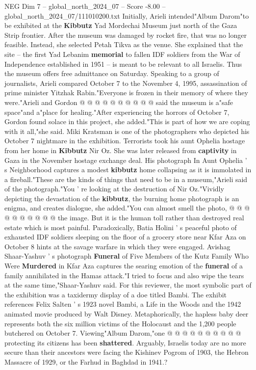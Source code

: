 \begin{textsample}{NEG Dim 7 – global\_north\_2024\_07 – Score -8.00 – global\_north\_2024\_07/111010200.txt}
Initially, Arieli intended"Album Darom"to be exhibited at the \textbf{Kibbutz} Yad Mordechai Museum just north of the Gaza Strip frontier.
After the museum was damaged by rocket fire, that was no longer feasible.
Instead, she selected Petah Tikva as the venue.
She explained that the site -- the first Yad Lebanim \textbf{memorial} to fallen IDF soldiers from the War of Independence established in 1951 -- is meant to be relevant to all Israelis.
Thus the museum offers free admittance on Saturday.
Speaking to a group of journalists, Arieli compared October 7 to the November 4, 1995, assassination of prime minister Yitzhak Rabin."Everyone is frozen in their memory of where they were."Arieli and Gordon @ @ @ @ @ @ @ @ @ @ said the museum is a"safe space"and a"place for healing."After experiencing the horrors of October 7, Gordon found solace in this project, she added."This is part of how we are coping with it all,"she said.
Miki Kratsman is one of the photographers who depicted his October 7 nightmare in the exhibition.
Terrorists took his aunt Ophelia hostage from her home in \textbf{Kibbutz} Nir Oz.
She was later released from \textbf{captivity} in Gaza in the November hostage exchange deal.
His photograph In Aunt Ophelia ' s Neighborhood captures a modest \textbf{kibbutz} home collapsing as it is immolated in a fireball."These are the kinds of things that need to be in a museum,"Arieli said of the photograph."You ' re looking at the destruction of Nir Oz."Vividly depicting the devastation of the \textbf{kibbutz}, the burning home photograph is an enigma, and creates dialogue, she added."You can almost smell the photo, @ @ @ @ @ @ @ @ @ @ the image.
But it is the human toll rather than destroyed real estate which is most painful.
Paradoxically, Batia Holini ' s peaceful photo of exhausted IDF soldiers sleeping on the floor of a grocery store near Kfar Aza on October 8 hints at the savage warfare in which they were engaged.
Avishag Shaar-Yashuv ' s photograph \textbf{Funeral} of Five Members of the Kutz Family Who Were \textbf{Murdered} in Kfar Aza captures the searing emotion of the \textbf{funeral} of a family annihilated in the Hamas attack."I tried to focus and also wipe the tears at the same time,"Shaar-Yashuv said.
For this reviewer, the most symbolic part of the exhibition was a taxidermy display of a doe titled Bambi.
The exhibit references Felix Salten ' s 1923 novel Bambi, a Life in the Woods and the 1942 animated movie produced by Walt Disney.
Metaphorically, the hapless baby deer represents both the six million victims of the Holocaust and the 1,200 people butchered on October 7.
Viewing"Album Darom,"one @ @ @ @ @ @ @ @ @ @ protecting its citizens has been \textbf{shattered}.
Arguably, Israelis today are no more secure than their ancestors were facing the Kishinev Pogrom of 1903, the Hebron Massacre of 1929, or the Farhud in Baghdad in 1941.?

\end{textsample}
